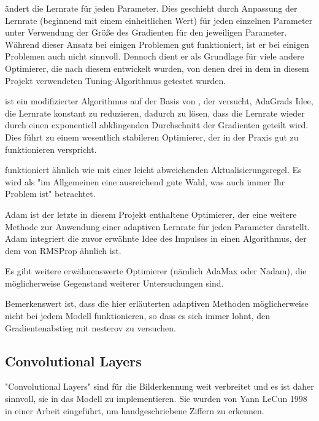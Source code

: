  \cite{Duchi2010} ändert die Lernrate für jeden Parameter.
Dies geschieht durch Anpassung der Lernrate (beginnend mit einem einheitlichen Wert) für jeden einzelnen Parameter unter Verwendung der Größe des Gradienten für den jeweiligen Parameter.
Während dieser Ansatz bei einigen Problemen gut funktioniert, ist er bei einigen Problemen auch nicht sinnvoll.
Dennoch dient er als Grundlage für viele andere Optimierer, die nach diesem entwickelt wurden, von denen drei in dem in diesem Projekt verwendeten Tuning-Algorithmus getestet wurden.

 \cite{Zeiler2012} ist ein modifizierter Algorithmus auf der Basis von , der versucht, AdaGrads Idee, die Lernrate konstant zu reduzieren, dadurch zu lösen, dass die Lernrate wieder durch einen exponentiell abklingenden Durchschnitt der Gradienten geteilt wird.
Dies führt zu einem wesentlich stabileren Optimierer, der in der Praxis gut zu funktionieren verspricht.

 \cite{Hinton2012} funktioniert ähnlich wie  mit einer leicht abweichenden Aktualisierungsregel.
Es wird als "im Allgemeinen eine ausreichend gute Wahl, was auch immer Ihr Problem ist" \cite[S.77]{Chollet2017} betrachtet.

Adam \cite{Kingma2014}\cite{Reddi2018} ist der letzte in diesem Projekt enthaltene Optimierer, der eine weitere Methode zur Anwendung einer adaptiven Lernrate für jeden Parameter darstellt.
Adam integriert die zuvor erwähnte Idee des Impulses in einen Algorithmus, der dem von RMSProp ähnlich ist.

Es gibt weitere erwähnenswerte Optimierer (nämlich AdaMax oder Nadam), die möglicherweise Gegenstand weiterer Untersuchungen sind.

Bemerkenswert ist, dass die hier erläuterten adaptiven Methoden möglicherweise nicht bei jedem Modell funktionieren, so dass es sich immer lohnt, den Gradientenabstieg mit nesterov\cite[S.358]{Geron2019} zu versuchen.

\subsection{Convolutional Layers}

"Convolutional Layers" sind für die Bilderkennung weit verbreitet und es ist daher sinnvoll, sie in das Modell zu implementieren.
Sie wurden von Yann LeCun 1998 in einer Arbeit \cite{Lecun1998} eingeführt, um handgeschriebene Ziffern zu erkennen.

